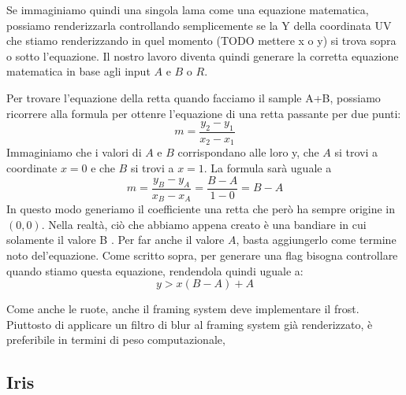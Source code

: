 \documentclass[main.tex]{subfiles}
\begin{document}
Se immaginiamo quindi una singola lama come una equazione matematica, possiamo renderizzarla controllando semplicemente se la Y della coordinata UV che stiamo renderizzando in quel momento (TODO mettere x o y) si trova sopra o sotto l'equazione. Il nostro lavoro diventa quindi generare la corretta equazione matematica in base agli input $A$ e $B$ o $R$.

Per trovare l'equazione della retta quando facciamo il sample A+B, possiamo ricorrere alla formula per ottenre l'equazione di una retta passante per due punti:
\[m = \frac{y_2 - y_1}{x_2 - x_1}\]
Immaginiamo che i valori di $A$ e $B$ corrispondano alle loro y, che $A$ si trovi a coordinate $x = 0$ e che $B$ si trovi a $x = 1$. La formula sarà uguale a
\[m = \frac{y_B - y_A}{x_B - x_A} = \frac{B - A}{1 - 0} = B - A\]
In questo modo generiamo il coefficiente una retta che però ha sempre origine in $(0, 0)$. Nella realtà, ciò che abbiamo appena creato è una bandiare in cui solamente il valore B . Per far  anche il valore $A$, basta aggiungerlo come termine noto del'equazione. Come scritto sopra, per generare una flag bisogna controllare quando stiamo  questa equazione, rendendola quindi uguale a:
\[y > x(B - A) + A\]


Come anche le ruote, anche il framing system deve implementare il frost. Piuttosto di applicare un filtro di blur al framing system già renderizzato, è preferibile in termini di peso computazionale,  



\subsection{Iris}\label{subsec:5_Iris}
\end{document}
